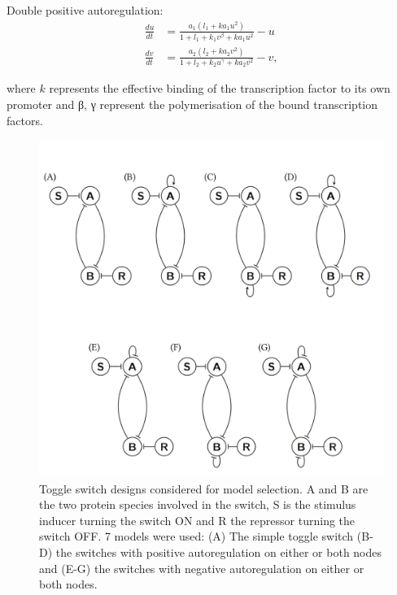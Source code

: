 \noindent Double positive autoregulation: 
\begin{align}\label{eq:gards_pos}
\frac{du}{dt} &= \frac{a_1  (l_1 + ka_{1}  u^{2}) }{1+l_1 + k_1  v^{\beta} + ka_{1}  u^{2}} - u \\
\frac{dv}{dt} &= \frac{a_2  (l_2 + ka_{2}  v^{2}) }{1+l_2 + k_2  u^{\gamma} + ka_{2}  v^{2}} - v,
\end{align}

\noindent where $k$ represents the effective binding of the transcription factor to its own promoter and β, γ represent the polymerisation of the bound transcription factors. 


\begin{figure}[tb]
	\begin{center}
\includegraphics[width=\textwidth]{../../chapters/chapterABCSysBio/images/toggle_switch_designs.png}
\caption[Model designs considered for model selection.]{\label{fig:toggle_switch_designs}Toggle switch designs considered for model selection. A and B are the two protein species involved in the switch, S is the stimulus inducer turning the switch ON and R the repressor turning the switch OFF. 7 models were used: (A) The simple toggle switch (B-D) the switches with positive autoregulation on either or both nodes and (E-G) the switches with negative autoregulation on either or both nodes.}
\end{center}
\end{figure}
\clearpage

